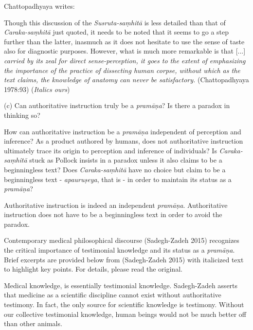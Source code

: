 Chattopadhyaya writes:
\begin{myquote}
Though this discussion of the {\sl Susruta-saṃhitā} is less detailed than that of {\sl Caraka-saṃhitā} just quoted, it needs to be noted that it seems to go a step further than the latter, inasmuch as it does not hesitate to use the sense of taste also for diagnostic purposes.  However, what is much more remarkable is that [...] {\sl carried by its zeal for direct sense-perception, it goes to the extent of emphasizing the importance of the practice of dissecting human corpse, without which as the text claims, the knowledge of anatomy can never be satisfactory.}
\hfill (Chattopadhyaya 1978:93) ({\sl Italics ours})
\end{myquote}

(c) Can authoritative instruction truly be a {{\sl pramāṇa}\relax}?  Is there a paradox in thinking so?

How can authoritative instruction be a {\sl pramāṇa} independent of perception and inference? As a product authored by humans, does not authoritative instruction ultimately trace its origin to perception and inference of individuals? Is {\sl Caraka-saṃhitā} stuck as Pollock insists in a paradox unless it also claims to be a beginningless text?  Does {\sl Caraka-saṃhitā} have no choice but claim to be a beginningless text - {\sl apauruṣeya}, that is - in order to maintain its status as a {\sl pramāṇa}?

Authoritative instruction is indeed an independent {{\sl pramāṇa}\relax}.  Authoritative instruction does not have to be a beginningless text in order to avoid the paradox.

Contemporary medical philosophical discourse (Sadegh-Zadeh 2015) recognizes the critical importance of testimonial knowledge and its status as a {\sl pramāṇa}.  Brief excerpts are provided below from (Sadegh-Zadeh 2015) with italicized text to highlight key points. For details, please read the original.
  
Medical knowledge, is essentially testimonial knowledge. Sadegh-Zadeh  asserts that medicine as a scientific discipline cannot exist without authoritative testimony. In fact, the only source for scientific knowledge is testimony. Without our collective testimonial knowledge, human beings would not be much better off than other animals.  

